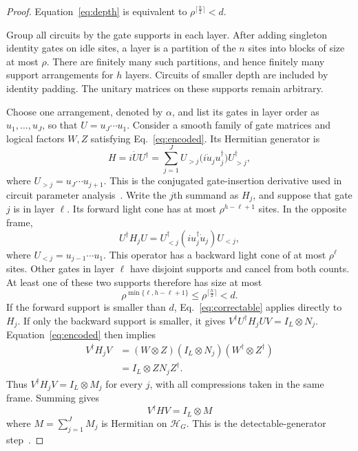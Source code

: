 \documentclass[aps,prl,reprint,notitlepage,nofootinbib,nobibnotes]{revtex4-2}
\newcommand{\HH}{\mathcal H}
\newcommand{\id}{I}
\begin{document}
\begin{proof}
Equation~\eqref{eq:depth} is equivalent to
\(\rho^{\lceil \frac{h}{2}\rceil}<d\).

Group all circuits by the gate supports in each layer. After adding
singleton identity gates on idle sites, a layer is a partition of the
\(n\) sites into blocks of size at most \(\rho\). There are finitely many
such partitions, and hence finitely many support arrangements for \(h\)
layers. Circuits of smaller depth are included by identity padding.
The unitary matrices on these supports remain arbitrary.

Choose one arrangement, denoted by \(\alpha\), and list its gates in
layer order as \(u_1,\ldots,u_J\), so that \(U=u_J\cdots u_1\).
Consider a smooth family of gate matrices and logical factors \(W,Z\)
satisfying Eq.~\eqref{eq:encoded}. Its Hermitian generator is
\begin{equation}\label{eq:generator}
  H=i\dot U U^\dagger
   =\sum_{j=1}^{J}
      U_{>j}\bigl(i\dot u_j u_j^\dagger\bigr)U_{>j}^\dagger,
\end{equation}
where \(U_{>j}=u_J\cdots u_{j+1}\). This is the conjugated
gate-insertion derivative used in circuit parameter
analysis~\cite{Haferkamp}.
Write the \(j\)th summand as \(H_j\), and suppose that gate \(j\)
is in layer \(\ell\). Its forward light cone has at most
\(\rho^{h-\ell+1}\) sites. In the opposite frame,
\[
  U^\dagger H_jU
   =U_{<j}^\dagger(iu_j^\dagger\dot u_j)U_{<j},
\]
where \(U_{<j}=u_{j-1}\cdots u_1\). This operator has a backward
light cone of at most \(\rho^\ell\) sites. Other gates in layer \(\ell\)
have disjoint supports and cancel from both counts.
At least one of these two supports therefore has size at most
\[
  \rho^{\min\{\ell,h-\ell+1\}}
  \le \rho^{\lceil \frac{h}{2}\rceil}<d.
\]
If the forward support is smaller than \(d\),
Eq.~\eqref{eq:correctable} applies directly to \(H_j\).
If only the backward support is smaller, it gives
\(V^\dagger U^\dagger H_jUV=\id_L\otimes N_j\).
Equation~\eqref{eq:encoded} then implies
\begin{align*}
 V^\dagger H_jV
  &=(W\otimes Z)(\id_L\otimes N_j)(W^\dagger\otimes Z^\dagger)\\
  &=\id_L\otimes ZN_jZ^\dagger.
\end{align*}
Thus \(V^\dagger H_jV=\id_L\otimes M_j\) for every \(j\), with all
compressions taken in the same frame.
Summing gives
\begin{equation}\label{eq:compression}
  V^\dagger H V=\id_L\otimes M
\end{equation}
where \(M=\sum_{j=1}^{J}M_j\) is Hermitian on \(\HH_G\).
This is the detectable-generator step~\cite{EK,Faist}.


\end{proof}
\end{document}
